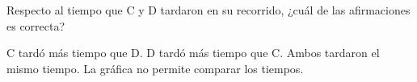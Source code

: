 Respecto al tiempo que C y D tardaron en su recorrido, ¿cuál de las afirmaciones es correcta?

\begin{choices}
    \CorrectChoice C tardó más tiempo que D.
    \choice D tardó más tiempo que C.
    \choice Ambos tardaron el mismo tiempo.
    \choice La gráfica no permite comparar los tiempos.
\end{choices}